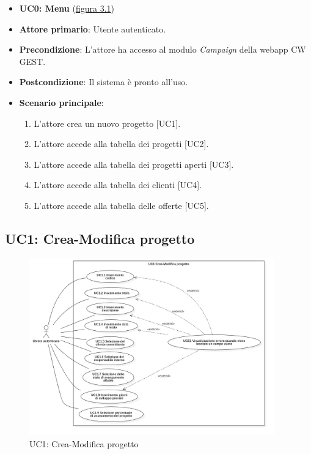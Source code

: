 \begin{itemize}
\item \textbf{UC0: Menu} ({\hyperref[fig:UC0]{figura 3.1}})
\item \textbf{Attore primario}: Utente autenticato.
\item \textbf{Precondizione}: L'attore ha accesso al modulo \textit{Campaign} della webapp CW GEST.
\item \textbf{Postcondizione}: Il sistema è pronto all'uso.
\item \textbf{Scenario principale}: 
\begin{enumerate}
\item L'attore crea un nuovo progetto [UC1].
\item L'attore accede alla tabella dei progetti [UC2].
\item L'attore accede alla tabella dei progetti aperti [UC3].
\item L'attore accede alla tabella dei clienti [UC4].
\item L'attore accede alla tabella delle offerte [UC5].
\end{enumerate}
\end{itemize}

\subsection{UC1: Crea-Modifica progetto}
\begin{figure}[!h]
\centering
\includegraphics[width=400px]{../images/UC/.jpeg/UC1-nuovoModificaProgetto.jpg}
\caption{UC1: Crea-Modifica progetto}
\label{fig:UC1}
\end{figure}

